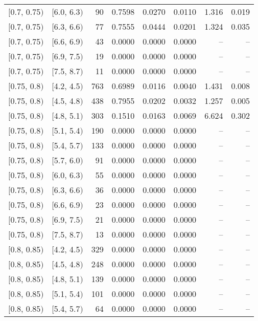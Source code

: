 \begin{longtable}{| l | l | r | r | r | r | r | r |}
        $[$0.7, 0.75$)$ & $[$6.0, 6.3$)$ & 90 & 0.7598 & 0.0270 & 0.0110 & 1.316 & 0.019 \\
        $[$0.7, 0.75$)$ & $[$6.3, 6.6$)$ & 77 & 0.7555 & 0.0444 & 0.0201 & 1.324 & 0.035 \\
        $[$0.7, 0.75$)$ & $[$6.6, 6.9$)$ & 43 & 0.0000 & 0.0000 & 0.0000 & -- & -- \\
        $[$0.7, 0.75$)$ & $[$6.9, 7.5$)$ & 19 & 0.0000 & 0.0000 & 0.0000 & -- & -- \\
        $[$0.7, 0.75$)$ & $[$7.5, 8.7$)$ & 11 & 0.0000 & 0.0000 & 0.0000 & -- & -- \\
        $[$0.75, 0.8$)$ & $[$4.2, 4.5$)$ & 763 & 0.6989 & 0.0116 & 0.0040 & 1.431 & 0.008 \\
        $[$0.75, 0.8$)$ & $[$4.5, 4.8$)$ & 438 & 0.7955 & 0.0202 & 0.0032 & 1.257 & 0.005 \\
        $[$0.75, 0.8$)$ & $[$4.8, 5.1$)$ & 303 & 0.1510 & 0.0163 & 0.0069 & 6.624 & 0.302 \\
        $[$0.75, 0.8$)$ & $[$5.1, 5.4$)$ & 190 & 0.0000 & 0.0000 & 0.0000 & -- & -- \\
        $[$0.75, 0.8$)$ & $[$5.4, 5.7$)$ & 133 & 0.0000 & 0.0000 & 0.0000 & -- & -- \\
        $[$0.75, 0.8$)$ & $[$5.7, 6.0$)$ & 91 & 0.0000 & 0.0000 & 0.0000 & -- & -- \\
        $[$0.75, 0.8$)$ & $[$6.0, 6.3$)$ & 55 & 0.0000 & 0.0000 & 0.0000 & -- & -- \\
        $[$0.75, 0.8$)$ & $[$6.3, 6.6$)$ & 36 & 0.0000 & 0.0000 & 0.0000 & -- & -- \\
        $[$0.75, 0.8$)$ & $[$6.6, 6.9$)$ & 23 & 0.0000 & 0.0000 & 0.0000 & -- & -- \\
        $[$0.75, 0.8$)$ & $[$6.9, 7.5$)$ & 21 & 0.0000 & 0.0000 & 0.0000 & -- & -- \\
        $[$0.75, 0.8$)$ & $[$7.5, 8.7$)$ & 13 & 0.0000 & 0.0000 & 0.0000 & -- & -- \\
        $[$0.8, 0.85$)$ & $[$4.2, 4.5$)$ & 329 & 0.0000 & 0.0000 & 0.0000 & -- & -- \\
        $[$0.8, 0.85$)$ & $[$4.5, 4.8$)$ & 248 & 0.0000 & 0.0000 & 0.0000 & -- & -- \\
        $[$0.8, 0.85$)$ & $[$4.8, 5.1$)$ & 139 & 0.0000 & 0.0000 & 0.0000 & -- & -- \\
        $[$0.8, 0.85$)$ & $[$5.1, 5.4$)$ & 101 & 0.0000 & 0.0000 & 0.0000 & -- & -- \\
        $[$0.8, 0.85$)$ & $[$5.4, 5.7$)$ & 64 & 0.0000 & 0.0000 & 0.0000 & -- & -- \\

\end{longtable}
